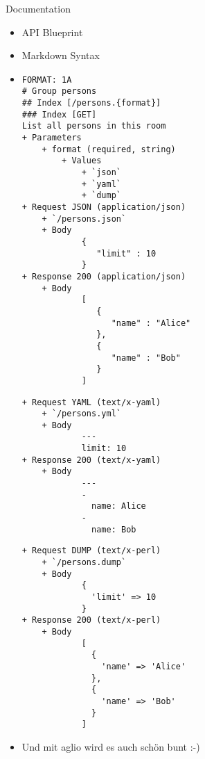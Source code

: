 \begin{frame}[fragile]{Documentation}

\begin{itemize}

\item API Blueprint\cite{apiblueprint}
\pause
\item Markdown Syntax
\pause

\item
{\tiny
\begin{multicols}{3}
\begin{verbatim}
FORMAT: 1A
# Group persons
## Index [/persons.{format}]
### Index [GET]
List all persons in this room
+ Parameters
    + format (required, string)
        + Values
            + `json`
            + `yaml`
            + `dump`
+ Request JSON (application/json)
    + `/persons.json`
    + Body
            {
               "limit" : 10
            }
+ Response 200 (application/json)
    + Body
            [
               {
                  "name" : "Alice"
               },
               {
                  "name" : "Bob"
               }
            ]
\end{verbatim}\columnbreak\begin{verbatim}
+ Request YAML (text/x-yaml)
    + `/persons.yml`
    + Body
            --- 
            limit: 10
+ Response 200 (text/x-yaml)
    + Body
            --- 
            - 
              name: Alice
            - 
              name: Bob
\end{verbatim}\columnbreak\begin{verbatim}
+ Request DUMP (text/x-perl)
    + `/persons.dump`
    + Body
            {
              'limit' => 10
            }
+ Response 200 (text/x-perl)
    + Body
            [
              {
                'name' => 'Alice'
              },
              {
                'name' => 'Bob'
              }
            ]
\end{verbatim}
\end{multicols}
}

\pause
\item Und mit aglio\cite{aglio} wird es auch schön bunt :-)
\end{itemize}

\end{frame}


